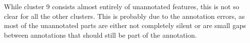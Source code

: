 While cluster 9 consists almost entirely of unannotated features, this is not so clear for all the other clusters. This is probably due to the annotation errors, as most of the unannotated parts are either not completely silent or are small gaps between annotations that should still be part of the annotation.

